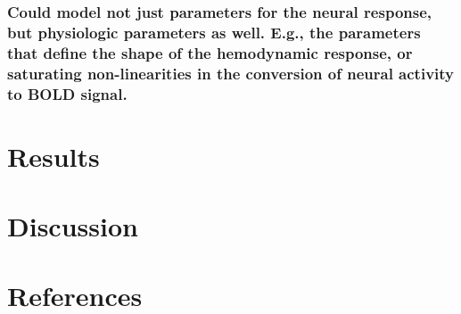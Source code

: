 \documentclass[
  man,floatsintext]{apa6}
\begin{document}
\hypertarget{could-model-not-just-parameters-for-the-neural-response-but-physiologic-parameters-as-well.-e.g.-the-parameters-that-define-the-shape-of-the-hemodynamic-response-or-saturating-non-linearities-in-the-conversion-of-neural-activity-to-bold-signal.}{%
\subsubsection{Could model not just parameters for the neural response, but physiologic parameters as well. E.g., the parameters that define the shape of the hemodynamic response, or saturating non-linearities in the conversion of neural activity to BOLD signal.}\label{could-model-not-just-parameters-for-the-neural-response-but-physiologic-parameters-as-well.-e.g.-the-parameters-that-define-the-shape-of-the-hemodynamic-response-or-saturating-non-linearities-in-the-conversion-of-neural-activity-to-bold-signal.}}

\hypertarget{results-1}{%
\section{Results}\label{results-1}}

\hypertarget{discussion-1}{%
\section{Discussion}\label{discussion-1}}

\newpage

\hypertarget{references}{%
\section{References}\label{references}}

\begingroup
\setlength{\parindent}{-0.5in}
\setlength{\leftskip}{0.5in}
\end{document}
